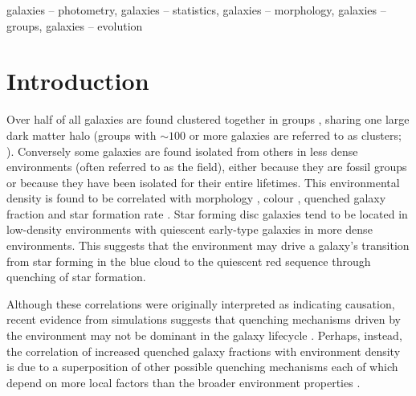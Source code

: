 \documentclass[useAMS,usenatbib]{mn2e}
\def\minor		{\color{minorcol}}
\begin{document}
\begin{keywords}
galaxies -- photometry, galaxies -- statistics, galaxies -- morphology, galaxies -- groups, galaxies -- evolution
\end{keywords}


\section{Introduction}\label{sec:intro}

Over half of all galaxies are found clustered together in groups \citep{zwicky38, abell58, huchra82, eke04}, sharing one large dark matter halo (groups with $\sim100$ or more galaxies are referred to as clusters; \citealt{bower04}). Conversely some galaxies are found isolated from others in less dense environments (often referred to as the field), either because they are fossil groups \citep[where all members have eventually merged;][]{ponman94, jones00, jones03} or because they have been isolated for their entire lifetimes. This environmental density is found to be correlated with morphology \citep{dressler80, smail97, poggianti99, postman05, Bamford09}, colour \citep{butcher78, pimbblet02}, quenched galaxy fraction \citep{kauffmann03, Baldry06, peng12, darvish16} and star formation rate \citep[SFR; ][]{gomez03}. Star forming disc galaxies tend to be located in low-density environments with quiescent early-type galaxies in more dense environments. This suggests that the environment may drive a galaxy's transition from star forming in the blue cloud to the quiescent red sequence through quenching of star formation. 
 
Although these correlations were originally interpreted as indicating causation, recent evidence from simulations suggests that quenching mechanisms driven by the environment may not be dominant in the galaxy lifecycle \citep{kimm09, kimm11, hirschmann14, wang14, phillips15, emerick16, fillingham16}. Perhaps, instead, the correlation of increased quenched galaxy fractions with environment density is due to a superposition of other possible quenching mechanisms each of which depend on more local factors {\minor \citep{kauffmann04, blanton06, cucciati10} than the broader environment properties \citep{balogh04, porter08, fadda08, darvish14, darvish17, alpaslan16, laigle17}.}
  
\end{document}
